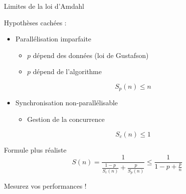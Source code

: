 
\begingroup

\begin{frame}{Limites de la loi d'Amdahl}

  \begin{block}{Hypothèses cachées :}
    \begin{itemize}
    \item Parallélisation imparfaite
      \begin{itemize}
      \item $p$ dépend des données (loi de Gustafson)
      \item $p$ dépend de l'algorithme
      \end{itemize}
      $$S_p(n) \le n$$
    \item Synchronisation non-parallélisable
      \begin{itemize}
      \item Gestion de la concurrence
      \end{itemize}
      $$S_c(n) \le 1$$
    \end{itemize}
  \end{block}

  \begin{block}{Formule plus réaliste}
    $$
    S(n) = \frac{1}{\frac{1-p}{S_c(n)} + \frac{p}{S_p(n)}} \le \frac{1}{1-p + \frac{p}{n}}
    $$
    \begin{center}
      \alert{Mesurez vos performances !}
    \end{center}
  \end{block}

\end{frame}

\endgroup
\endinput
